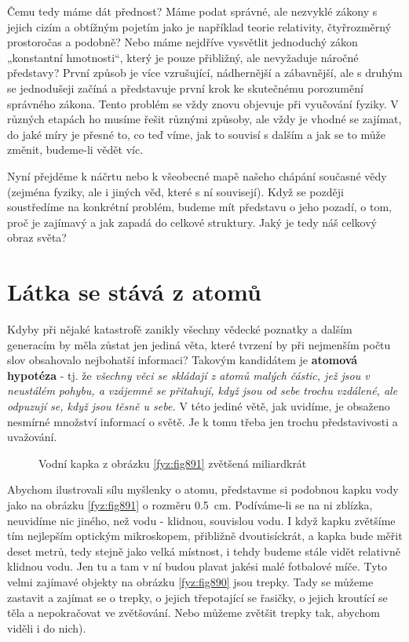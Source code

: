     Čemu tedy máme dát přednost? Máme podat správné, ale nezvyklé zákony s jejich cizím a obtížným
    pojetím jako je například teorie relativity, čtyřrozměrný prostoročas a podobně? Nebo máme
    nejdříve vysvětlit jednoduchý zákon „konstantní hmotnosti“, který je pouze přibližný, ale
    nevyžaduje náročné představy? První způsob je více vzrušující, nádhernější a zábavnější, ale s
    druhým se jednodušeji začíná a představuje první krok ke skutečnému porozumění správného zákona.
    Tento problém se vždy znovu objevuje při vyučování fyziky. V různých etapách ho musíme řešit
    různými způsoby, ale vždy je vhodné se zajímat, do jaké míry je přesné to, co teď víme, jak to
    souvisí s dalším a jak se to může změnit, budeme-li vědět víc.
    
    Nyní přejděme k náčrtu nebo k všeobecné mapě našeho chápání současné vědy (zejména fyziky, ale i
    jiných věd, které s ní souvisejí). Když se později soustředíme na konkrétní problém, budeme mít
    představu o jeho pozadí, o tom, proč je zajímavý a jak zapadá do celkové struktury. Jaký je tedy
    náš celkový obraz světa? \cite[s.~16]{Feynman01}
    
  \section{Látka se stává z atomů}
    Kdyby při nějaké katastrofě zanikly všechny vědecké poznatky a dalším generacím by měla zůstat
    jen jediná věta, které tvrzení by při nejmenším počtu slov obsahovalo nejbohatší informaci?
    Takovým kandidátem je \textbf{atomová hypotéza} - tj. že \emph{všechny věci se skládají z atomů
    malých částic, jež jsou v neustálém pohybu,  a vzájemně se přitahují, když jsou od sebe trochu
    vzdálené, ale odpuzují se, když jsou těsně u sebe.} V této jediné větě, jak uvidíme, je obsaženo
    nesmírné množství informací o světě. Je k tomu třeba jen trochu představivosti a uvažování.

    \begin{figure}[ht!]  %
      \centering
      \caption{Vodní kapka z obrázku \ref{fyz:fig891} zvětšená miliardkrát \cite[s.~17]{Feynman01}}
      \label{fyz:fig007}
    \end{figure} 

    Abychom ilustrovali sílu myšlenky o atomu, představme si podobnou kapku vody jako na obrázku
    \ref{fyz:fig891} o rozměru \SI{0.5}{\cm}. Podí\-váme-li se na ni zblízka, neuvidíme nic jiného,
    než vodu - klidnou, souvislou vodu. I když kapku zvětšíme tím nejlepším optickým mikroskopem,
    přibližně dvoutisíckrát, a kapka bude měřit deset metrů, tedy stejně jako velká místnost, i
    tehdy budeme stále vidět relativně klidnou vodu. Jen tu a tam v ní budou plavat jakési malé
    fotbalové míče. Tyto velmi zajímavé objekty na obrázku \ref{fyz:fig890} jsou trepky. Tady se
    můžeme zastavit a zajímat se o trepky, o jejich třepotající se řasičky, o jejich kroutící se
    těla a nepokračovat ve zvětšování. Nebo můžeme zvětšit trepky tak, abychom viděli i do nich). 

